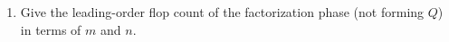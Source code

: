\documentclass{ximera}
\begin{document}
\begin{exercise}
\begin{enumerate}
\item Give the leading-order flop count of the factorization phase
(not forming $Q$) in terms of $m$ and $n$.


\end{enumerate}

%
%
%

\end{exercise}
\end{document}
